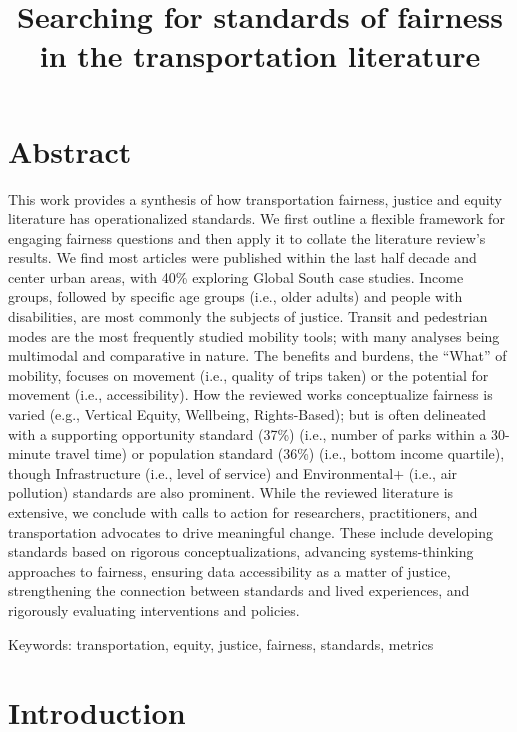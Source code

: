 \documentclass[
  letterpaper,
  DIV=11,
  numbers=noendperiod]{scrartcl}
\title{Searching for standards of fairness in the transportation
literature}
\author{}
\date{}
\begin{document}
\maketitle

\section{Abstract}\label{abstract}

This work provides a synthesis of how transportation fairness, justice
and equity literature has operationalized standards. We first outline a
flexible framework for engaging fairness questions and then apply it to
collate the literature review's results. We find most articles were
published within the last half decade and center urban areas, with 40\%
exploring Global South case studies. Income groups, followed by specific
age groups (i.e., older adults) and people with disabilities, are most
commonly the subjects of justice. Transit and pedestrian modes are the
most frequently studied mobility tools; with many analyses being
multimodal and comparative in nature. The benefits and burdens, the
``What'' of mobility, focuses on movement (i.e., quality of trips taken)
or the potential for movement (i.e., accessibility). How the reviewed
works conceptualize fairness is varied (e.g., Vertical Equity,
Wellbeing, Rights-Based); but is often delineated with a supporting
opportunity standard (37\%) (i.e., number of parks within a 30-minute
travel time) or population standard (36\%) (i.e., bottom income
quartile), though Infrastructure (i.e., level of service) and
Environmental+ (i.e., air pollution) standards are also prominent. While
the reviewed literature is extensive, we conclude with calls to action
for researchers, practitioners, and transportation advocates to drive
meaningful change. These include developing standards based on rigorous
conceptualizations, advancing systems-thinking approaches to fairness,
ensuring data accessibility as a matter of justice, strengthening the
connection between standards and lived experiences, and rigorously
evaluating interventions and policies.

Keywords: transportation, equity, justice, fairness, standards, metrics

\section{Introduction}\label{introduction}
\end{document}
